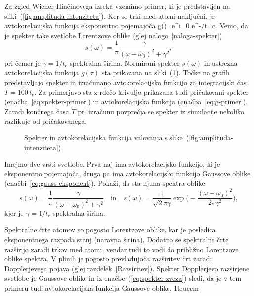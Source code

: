 Za zgled Wiener-Hinčinovega izreka vzemimo primer, ki je predstavljen na 
sliki~(\ref{fig:amplituda-intenziteta}). 
Ker so trki med atomi naključni, je avtokorelacijska funkcija eksponentno pojemajoča
\beq
g(\tau)=e^{i\omega_{0}\tau} e^{-\tau/t_{c}}.
\label{eq:g-primer}
\eeq
Vemo, da je spekter take svetlobe Lorentzove 
oblike (glej nalogo~\ref{naloga-spekter})
\begin{equation}
s(\omega)=\frac{1}{\pi}\frac{\gamma}{(\omega-\omega_{0})^{2}+\gamma^{2}},
\label{eq:spekter-primer}
\end{equation}
pri čemer je $\gamma=1/t_{c}$ spektralna širina. 
Normirani spekter $s(\omega)$ in ustrezna avtokorelacijska funkcija $g(\tau)$ 
sta prikazana na sliki~(\ref{fig:SpekterAc}). 
Točke na grafih 
predstavljajo spekter in izračunano avtokorelacijsko funkcijo 
za integracijski čas $T=100\,t_{c}$. Za primerjavo sta z rdečo 
krivuljo prikazana tudi pričakovani spekter (enačba~\ref{eq:spekter-primer}) in avtokorelacijska
funkcija (enačba~\ref{eq:g-primer}). Zaradi končnega
časa $T$ pri izračunu povprečja se spekter iz simulacije nekoliko razlikuje
od pričakovanega. 
\begin{figure}[h]
\centering
\def\svgwidth{65truemm} 
\qquad
\def\svgwidth{65truemm} 

\caption{Spekter in avtokorelacijska funkcija valovanja s slike~(\ref{fig:amplituda-intenziteta})}
\label{fig:SpekterAc}
\end{figure}

\begin{definition}
\label{naloga-spekter}
Imejmo dve vrsti svetlobe. Prva naj ima avtokorelacijsko funkcijo, ki je eksponentno pojemajoča, druga
pa ima avtokorelacijsko funkcijo Gaussove oblike (enačbi~\ref{eq:gauss-eksponent}). Pokaži, da sta njuna
spektra oblike
\begin{equation}
s(\omega)=
\frac{1}{\pi}\frac{\gamma}{(\omega-\omega_{0})^{2}+\gamma^{2}} \quad \mathrm{in} \quad 
s(\omega)= \frac{1}{\sqrt{2}\pi\gamma}\exp\big(-
\frac{\left(\omega-\omega_{0}\right)^{2}}{2\pi\gamma^{2}}\big),
\end{equation}
kjer je $\gamma=1/t_{c}$ spektralna širina. 
\end{definition}

Spektralne črte atomov so pogosto Lorentzove oblike, kar je posledica
eksponentnega razpada stanj (naravna širina). Dodatno se spektralne
črte razširijo zaradi trkov med atomi, vendar tudi to vodi do približno Lorentzove
oblike spektra. V plinih je pogosto prevladujoča razširitev črt
zaradi Dopplerjevega pojava (glej razdelek~\ref{Razsiritev}). Spekter 
Dopplerjevo razširjene svetlobe je Gaussove oblike in iz enačbe~(\ref{eq:spekter-zveza})
sledi, da je v tem primeru tudi avtokorelacijska funkcija Gaussove oblike.
\vglue1truecm

